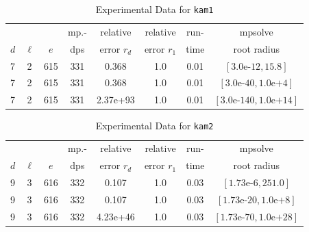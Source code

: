 \documentclass[runningheads]{llncs}
\begin{document}
\begin{table}
\caption{Experimental Data for \texttt{kam1}} %
\label{tab:kam1}
\vskip -0.15in
\begin{center}
\begin{small}
\begin{sc}
\begin{tabular}{lccccccc}
\toprule
&  &  & mp.-& relative  & relative & run- & mpsolve \\
$d$& $\ell$& $e$ & dps&error $r_d$       & error $r_1$ &time& root radius\\
\midrule
 7 & 2 & 615 & 331 & 0.368 & 1.0 & 0.01 & $[3.0\text{e-}12, 15.8]$\\
 7 & 2 & 615 & 331 & 0.368 & 1.0 & 0.01 & $[3.0\text{e-}40, 1.0\text{e+}4]$\\
 7 & 2 & 615 & 331 & 2.37e+93 & 1.0 & 0.01 & $[3.0\text{e-}140, 1.0\text{e+}14]$\\
\bottomrule
\end{tabular}
\end{sc}
\end{small}
\end{center}
\vskip 0.05in
\end{table}

\begin{table}
\caption{Experimental Data for \texttt{kam2}} %
\label{tab:kam2}
\vskip -0.15in
\begin{center}
\begin{small}
\begin{sc}
\begin{tabular}{lccccccc}
\toprule
&  &  & mp.-& relative  & relative & run- & mpsolve \\
$d$& $\ell$& $e$ & dps&error $r_d$       & error $r_1$ &time& root radius\\
\midrule
 9 & 3 & 616 & 332 & 0.107 & 1.0 & 0.03 & $[1.73\text{e-}6, 251.0]$\\
 9 & 3 & 616 & 332 & 0.107 & 1.0 & 0.03 & $[1.73\text{e-}20, 1.0\text{e+}8]$\\
 9 & 3 & 616 & 332 & 4.23e+46 & 1.0 & 0.03 & $[1.73\text{e-}70, 1.0\text{e+}28]$\\
\bottomrule
\end{tabular}
\end{sc}
\end{small}
\end{center}
\vskip 0.05in
\end{table}
\end{document}
